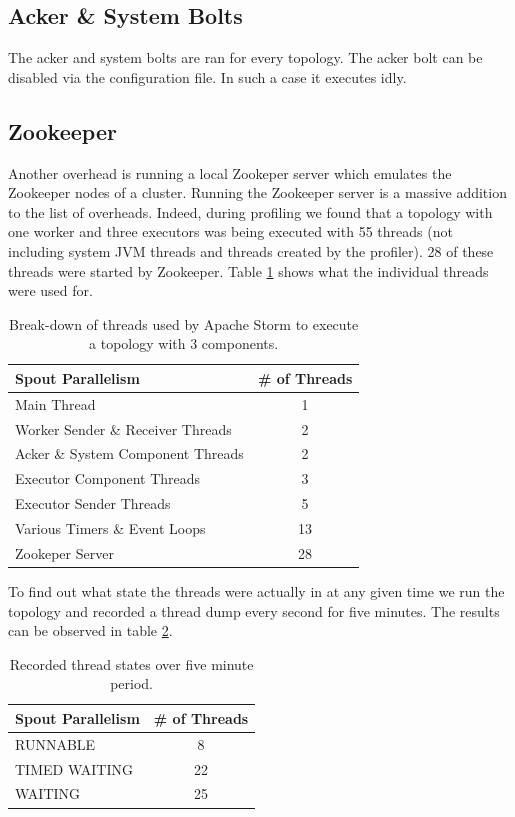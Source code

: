 \subsection{Acker \& System Bolts}

The acker and system bolts are ran for every topology. The acker bolt can be disabled via the configuration file. In such a case it executes idly.

\subsection{Zookeeper}

Another overhead is running a local Zookeper server which emulates the Zookeeper nodes of a cluster. Running the Zookeeper server is a massive addition to the list of overheads. Indeed, during profiling we found that a topology with one worker and three executors was being executed with 55 threads (not including system JVM threads and threads created by the profiler). 28 of these threads were started by Zookeeper. Table \ref{table:breakdown} shows what the individual threads were used for.

\begin{table}[h!]
\centering
\begin{tabular}{@{}lc@{}}
    \textbf{Spout Parallelism} & \textbf{\# of Threads} \\ \toprule
    Main Thread & 1  \\
	Worker Sender \& Receiver Threads & 2  \\
    Acker \& System Component Threads & 2  \\
    Executor Component Threads & 3  \\
    Executor Sender Threads & 5  \\
    Various Timers \& Event Loops & 13  \\
    Zookeper Server & 28  \\
\end{tabular}
\caption{Break-down of threads used by Apache Storm to execute a topology with 3 components.}
\label{table:breakdown}
\end{table}

To find out what state the threads were actually in at any given time we run the topology and recorded a thread dump every second for five minutes. The results can be observed in table \ref{table:dump}.

\begin{table}[h!]
\centering
\begin{tabular}{@{}lc@{}}
    \textbf{Spout Parallelism} & \textbf{\# of Threads} \\ \toprule
    RUNNABLE & 8  \\
	TIMED WAITING & 22  \\
    WAITING & 25  \\
\end{tabular}
\caption{Recorded thread states over five minute period.}
\label{table:dump}
\end{table}

